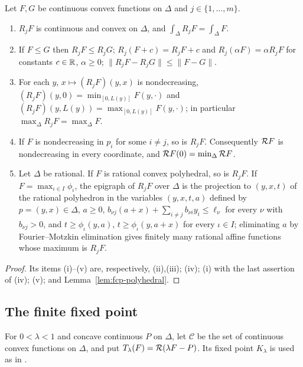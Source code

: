 \begin{lemma}[Properties of $R_j$]\label{lem:cmp-rearrangement}
Let $F,G$ be continuous convex functions on $\Delta$ and $j\in\{1,\dots,m\}$.
\begin{enumerate}[label=(\roman*)]
\item $R_jF$ is continuous and convex on $\Delta$, and $\int_\Delta R_jF=\int_\Delta F$.
\item If $F\le G$ then $R_jF\le R_jG$; $R_j(F+c)=R_jF+c$ and $R_j(\alpha F)=\alpha R_jF$ for constants $c\in\mathbb{R}$,
 $\alpha\ge0$; $\|R_jF-R_jG\|\le\|F-G\|$.
\item For each $y$, $x\mapsto(R_jF)(y,x)$ is nondecreasing, $(R_jF)(y,0)=\min_{[0,L(y)]}F(y,\cdot)$ and
 $(R_jF)(y,L(y))=\max_{[0,L(y)]}F(y,\cdot)$; in particular $\max_\Delta R_jF=\max_\Delta F$.
\item If $F$ is nondecreasing in $p_i$ for some $i\ne j$, so is $R_jF$. Consequently $\mathcal{R} F$ is
 nondecreasing in every coordinate, and $\mathcal{R} F(0)=\min_\Delta\mathcal{R} F$.
\item Let $\Delta$ be rational. If $F$ is rational convex polyhedral, so is $R_jF$. If $F=\max_{\iota\in I}\phi_\iota$,
 the epigraph of $R_jF$ over $\Delta$ is the projection to $(y,x,t)$ of the rational polyhedron in the variables
 $(y,x,t,a)$ defined by $p=(y,x)\in\Delta$, $a\ge0$, $b_{\nu j}(a+x)+\sum_{i\ne j}b_{\nu i}y_i\le\ell_\nu$ for every
 $\nu$ with $b_{\nu j}>0$, and $t\ge\phi_\iota(y,a)$, $t\ge\phi_\iota(y,a+x)$ for every $\iota\in I$; eliminating $a$
 by Fourier--Motzkin elimination gives finitely many rational affine functions whose maximum is $R_jF$.
\end{enumerate}
\end{lemma}

\begin{proof}
Its items (i)--(v) are, respectively, (ii),(iii); (iv); (i) with the last assertion of (iv); (v); and Lemma~\ref{lem:fcp-polyhedral}.
\end{proof}

\subsection{The finite fixed point}\label{sec:fcp-fixed}

For $0<\lambda<1$ and concave continuous $P$ on $\Delta$, let $\mathcal C$ be the set of continuous convex functions on $\Delta$, and put $T_\lambda(F)=\mathcal{R}(\lambda F-P)$. Its fixed point $K_\lambda$ is used as in \cite[\S2.2]{OpenAI2026}.

